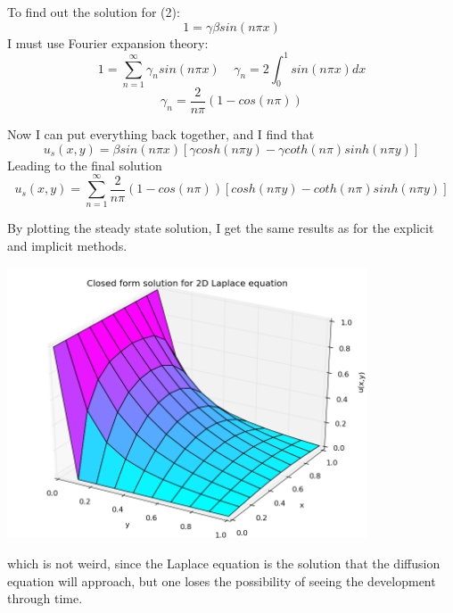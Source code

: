 \documentclass[a4paper, 12pt, titlepage]{article}
\newcommand{\beq}{\begin{equation*}}
\newcommand{\eeq}{\end{equation*}}
\newcommand{\beqq}{\begin{equation}}
\newcommand{\eeqq}{\end{equation}}
\begin{document}
\begin{section}
\begin{subsection}
  To find out the solution for (2):
  \beq 1 = \gamma \beta sin(n\pi x) \eeq
  I must use Fourier expansion theory:
  \beq 1 = \sum_{n=1}^{\infty} \gamma_n sin(n\pi x) \;\;\;\; \gamma_n = 2\int_0^1 sin(n\pi x) dx \eeq 
  \beq \gamma_n = \frac{2}{n\pi}(1 - cos(n\pi)) \eeq 
  
  Now I can put everything back together, and I find that
  \beq u_s(x,y) = \beta sin(n\pi x) [\gamma cosh(n\pi y) - \gamma coth(n\pi) sinh(n\pi y)] \eeq
  Leading to the final solution
  \beqq u_s(x,y) = \sum_{n=1}^{\infty} \frac{2}{n\pi}(1-cos(n\pi)) [cosh(n\pi y) - coth(n\pi) sinh(n\pi y)] \eeqq
  
  By plotting the steady state solution, I get the same results as for the explicit and implicit methods.
  
  \includegraphics[width=0.8\textwidth]{build-main-Desktop-Debug/SteadyState.png}
  
  which is not weird, since the Laplace equation is the solution that the diffusion equation will approach,
  but one loses the possibility of seeing the development through time. 
  \end{subsection}
  
  
  
  \end{section}
\end{document}

